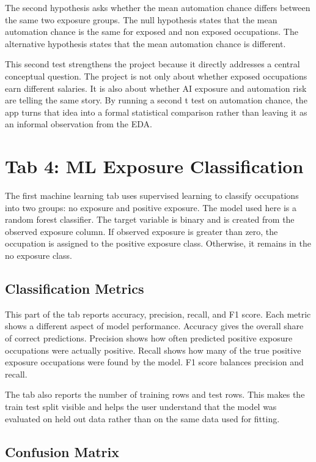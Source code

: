 \documentclass[11pt]{article}
\begin{document}
The second hypothesis asks whether the mean automation chance differs between the same two exposure groups. The null hypothesis states that the mean automation chance is the same for exposed and non exposed occupations. The alternative hypothesis states that the mean automation chance is different.

This second test strengthens the project because it directly addresses a central conceptual question. The project is not only about whether exposed occupations earn different salaries. It is also about whether AI exposure and automation risk are telling the same story. By running a second t test on automation chance, the app turns that idea into a formal statistical comparison rather than leaving it as an informal observation from the EDA.

\section*{Tab 4: ML Exposure Classification}

The first machine learning tab uses supervised learning to classify occupations into two groups: no exposure and positive exposure. The model used here is a random forest classifier. The target variable is binary and is created from the observed exposure column. If observed exposure is greater than zero, the occupation is assigned to the positive exposure class. Otherwise, it remains in the no exposure class.

\subsection*{Classification Metrics}

This part of the tab reports accuracy, precision, recall, and F1 score. Each metric shows a different aspect of model performance. Accuracy gives the overall share of correct predictions. Precision shows how often predicted positive exposure occupations were actually positive. Recall shows how many of the true positive exposure occupations were found by the model. F1 score balances precision and recall.

The tab also reports the number of training rows and test rows. This makes the train test split visible and helps the user understand that the model was evaluated on held out data rather than on the same data used for fitting.

\subsection*{Confusion Matrix}
\end{document}
